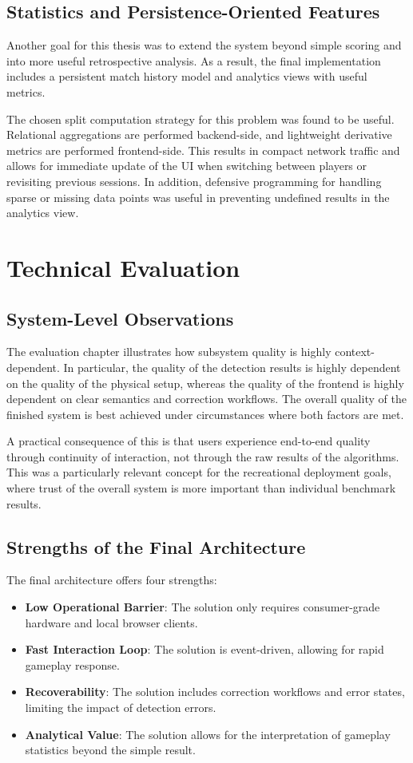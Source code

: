 \subsection{Statistics and Persistence-Oriented Features}
Another goal for this thesis was to extend the system beyond simple scoring and into more useful retrospective analysis. As a result, the final implementation includes a persistent match history model and analytics views with useful metrics.

The chosen split computation strategy for this problem was found to be useful. Relational aggregations are performed backend-side, and lightweight derivative metrics are performed frontend-side. This results in compact network traffic and allows for immediate update of the UI when switching between players or revisiting previous sessions. In addition, defensive programming for handling sparse or missing data points was useful in preventing undefined results in the analytics view.

\section{Technical Evaluation}
\subsection{System-Level Observations}
The evaluation chapter illustrates how subsystem quality is highly context-dependent. In particular, the quality of the detection results is highly dependent on the quality of the physical setup, whereas the quality of the frontend is highly dependent on clear semantics and correction workflows. The overall quality of the finished system is best achieved under circumstances where both factors are met.

A practical consequence of this is that users experience end-to-end quality through continuity of interaction, not through the raw results of the algorithms. This was a particularly relevant concept for the recreational deployment goals, where trust of the overall system is more important than individual benchmark results. 

\subsection{Strengths of the Final Architecture}
The final architecture offers four strengths:
\begin{itemize}
	\item \textbf{Low Operational Barrier}: The solution only requires consumer-grade hardware and local browser clients.
	\item \textbf{Fast Interaction Loop}: The solution is event-driven, allowing for rapid gameplay response.
	\item \textbf{Recoverability}: The solution includes correction workflows and error states, limiting the impact of detection errors.
	\item \textbf{Analytical Value}: The solution allows for the interpretation of gameplay statistics beyond the simple result.
\end{itemize}

